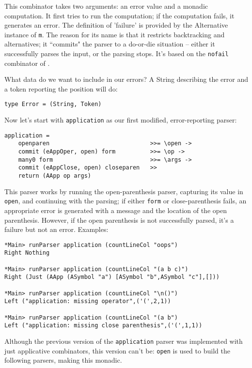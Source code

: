 \documentclass{tmr}
\begin{document}
This combinator takes two arguments: an error value and a monadic 
computation.  It first tries to run the computation; if the computation 
fails, it generates an error.  The 
definition of 'failure' is provided by the Alternative instance of \verb+m+.
The reason for its name is that it restricts backtracking and alternatives;
it ``commits" the parser to a do-or-die situation -- either it successfully
parses the input, or the parsing stops.  It's based on the \verb+nofail+
combinator of \cite{hutton1992higher}.

What data do we want to include in our errors?  A String describing the error 
and a token reporting the position will do:
\begin{verbatim}
type Error = (String, Token)
\end{verbatim}

Now let's start with \verb+application+ as our first modified, error-reporting 
parser:
\begin{verbatim}
application =
    openparen                             >>= \open ->
    commit (eAppOper, open) form          >>= \op ->
    many0 form                            >>= \args ->
    commit (eAppClose, open) closeparen   >>
    return (AApp op args)
\end{verbatim}
This parser works by running the open-parenthesis parser, capturing its value 
in \verb+open+, and continuing with the parsing; if either \verb+form+ or 
close-parenthesis fails, an appropriate error is generated with a message and 
the location of the open parenthesis.  However, if the open 
parenthesis is not successfully parsed, it's a failure but not an error.  
Examples:
\begin{verbatim}
*Main> runParser application (countLineCol "oops")
Right Nothing

*Main> runParser application (countLineCol "(a b c)")
Right (Just (AApp (ASymbol "a") [ASymbol "b",ASymbol "c"],[]))

*Main> runParser application (countLineCol "\n()")
Left ("application: missing operator",('(',2,1))

*Main> runParser application (countLineCol "(a b")
Left ("application: missing close parenthesis",('(',1,1))
\end{verbatim}

Although the previous version of the \verb+application+ parser was implemented 
with just applicative combinators, this version can't be:  \verb+open+ 
is used to build the following parsers, making this monadic.
\end{document}
